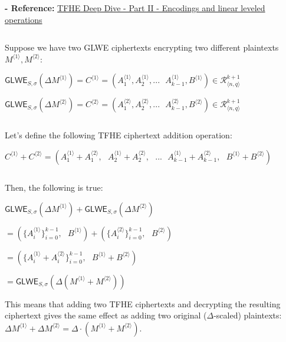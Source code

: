 \textbf{- Reference:} 
\href{https://www.zama.ai/post/tfhe-deep-dive-part-2}{TFHE Deep Dive - Part II - Encodings and linear leveled operations}~\cite{tfhe-2}


$ $

Suppose we have two GLWE ciphertexts encrypting two different plaintexts $M^{\langle 1 \rangle}, M^{\langle 2 \rangle}$:

$\textsf{GLWE}_{S, \sigma}(\Delta M^{\langle 1 \rangle} ) = C^{\langle 1 \rangle} = ( A_1^{\langle 1 \rangle}, A_2^{\langle 1 \rangle}, ... \text{ } A_{k-1}^{\langle 1 \rangle}, B^{\langle 1 \rangle}) \in \mathcal{R}_{\langle n,q \rangle}^{k + 1}$

$\textsf{GLWE}_{S, \sigma}(\Delta M^{\langle 2 \rangle} ) = C^{\langle 2 \rangle} = ( A_1^{\langle 2 \rangle}, A_2^{\langle 2 \rangle}, ... \text{ } A_{k-1}^{\langle 2 \rangle}, B^{\langle 2 \rangle}) \in \mathcal{R}_{\langle n,q \rangle}^{k + 1}$

$ $

\noindent Let's define the following TFHE ciphertext addition operation: 

$C^{\langle 1 \rangle} + C^{\langle 2 \rangle} = ( A_1^{\langle 1 \rangle} + A_1^{\langle 2 \rangle}, \text{ } A_2^{\langle 1 \rangle} + A_2^{\langle 2 \rangle}, \text{ } ... \text{ } A_{k-1}^{\langle 1 \rangle} + A_{k-1}^{\langle 2 \rangle}, \text{ } B^{\langle 1 \rangle} + B^{\langle 2 \rangle} )$

$ $

\noindent Then, the following is true:

\begin{tcolorbox}[title={\textbf{\tboxlabel{\ref*{sec:glwe-add-cipher}} GLWE Homomorphic Addition}}]
$\textsf{GLWE}_{S, \sigma}(\Delta M^{\langle 1 \rangle} ) + \textsf{GLWE}_{S, \sigma}(\Delta M^{\langle 2 \rangle} ) $

$ = ( \{A_i^{\langle 1 \rangle}\}_{i=0}^{k-1}, \text{ } B^{\langle 1 \rangle}) + (\{A_i^{\langle 2 \rangle}\}_{i=0}^{k-1}, \text{ } B^{\langle 2 \rangle}) $

$ = ( \{A_i^{\langle 1 \rangle} + A_i^{\langle 2 \rangle}\}_{i=0}^{k-1}, \text{ } B^{\langle 1 \rangle} + B^{\langle 2 \rangle} ) $

$= \textsf{GLWE}_{S, \sigma}(\Delta(M^{\langle 1 \rangle} + M^{\langle 2 \rangle}) )$
\end{tcolorbox}


This means that adding two TFHE ciphertexts and decrypting the resulting ciphertext gives the same effect as adding two original ($\Delta$-scaled) plaintexts: $\Delta M^{\langle 1 \rangle} + \Delta M^{\langle 2 \rangle} = \Delta \cdot (M^{\langle 1 \rangle} + M^{\langle 2 \rangle})$. 


